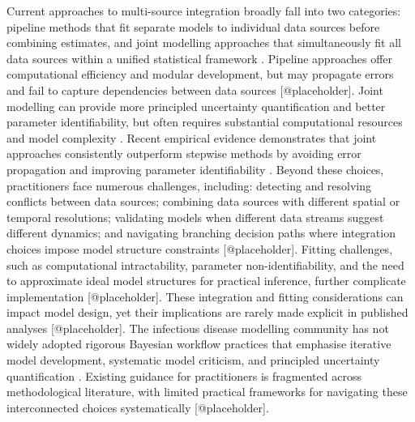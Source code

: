 \documentclass{article}
\begin{document}
Current approaches to multi-source integration broadly fall into two categories: pipeline methods that fit separate models to individual data sources before combining estimates, and joint modelling approaches that simultaneously fit all data sources within a unified statistical framework \citep{deangelis2018analysing, russell2024combined}.
Pipeline approaches offer computational efficiency and modular development, but may propagate errors and fail to capture dependencies between data sources [@placeholder].
Joint modelling can provide more principled uncertainty quantification and better parameter identifiability, but often requires substantial computational resources and model complexity \citep{russell2024combined, lison2024generative}.
Recent empirical evidence demonstrates that joint approaches consistently outperform stepwise methods by avoiding error propagation and improving parameter identifiability \citep{lison2024generative}.
Beyond these choices, practitioners face numerous challenges, including: detecting and resolving conflicts between data sources; combining data sources with different spatial or temporal resolutions; validating models when different data streams suggest different dynamics; and navigating branching decision paths where integration choices impose model structure constraints [@placeholder].
Fitting challenges, such as computational intractability, parameter non-identifiability, and the need to approximate ideal model structures for practical inference, further complicate implementation [@placeholder].
These integration and fitting considerations can impact model design, yet their implications are rarely made explicit in published analyses [@placeholder].
The infectious disease modelling community has not widely adopted rigorous Bayesian workflow practices that emphasise iterative model development, systematic model criticism, and principled uncertainty quantification \citep{gelman2020bayesian, nicholson2022interoperability}.
Existing guidance for practitioners is fragmented across methodological literature, with limited practical frameworks for navigating these interconnected choices systematically [@placeholder].
\end{document}
